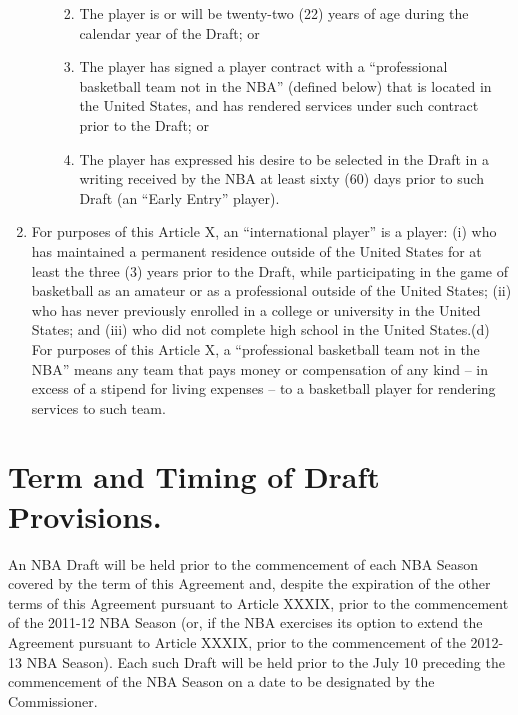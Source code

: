 \documentclass[
]{book}
\providecommand{\tightlist}{%
  \setlength{\itemsep}{0pt}\setlength{\parskip}{0pt}}
\begin{document}
\begin{enumerate}
\begin{enumerate}
    \begin{enumerate}
    \def\labelenumiii{(\arabic{enumiii})}
    \tightlist
    \item
      The player is or will be twenty-two (22) years of age during the calendar year of the Draft; or
    \item
      The player has signed a player contract with a ``professional basketball team not in the NBA'' (defined below) that is located in the United States, and has rendered services under such contract prior to the Draft; or
    \item
      The player has expressed his desire to be selected in the Draft in a writing received by the NBA at least sixty (60) days prior to such Draft (an ``Early Entry'' player).
    \end{enumerate}
  \end{enumerate}
\item
  For purposes of this Article X, an ``international player'' is a player: (i) who has maintained a permanent residence outside of the United States for at least the three (3) years prior to the Draft, while participating in the game of basketball as an amateur or as a professional outside of the United States; (ii) who has never previously enrolled in a college or university in the United States; and (iii) who did not complete high school in the United States.(d) For purposes of this Article X, a ``professional basketball team not in the NBA'' means any team that pays money or compensation of any kind -- in excess of a stipend for living expenses -- to a basketball player for rendering services to such team.
\end{enumerate}

\hypertarget{term-and-timing-of-draft-provisions.}{%
\section{Term and Timing of Draft Provisions.}\label{term-and-timing-of-draft-provisions.}}

An NBA Draft will be held prior to the commencement of each NBA Season covered by the term of this Agreement and, despite the expiration of the other terms of this Agreement pursuant to Article XXXIX, prior to the commencement of the 2011-12 NBA Season (or, if the NBA exercises its option to extend the Agreement pursuant to Article XXXIX, prior to the commencement of the 2012-13 NBA Season). Each such Draft will be held prior to the July 10 preceding the commencement of the NBA Season on a date to be designated by the Commissioner.
\end{document}

